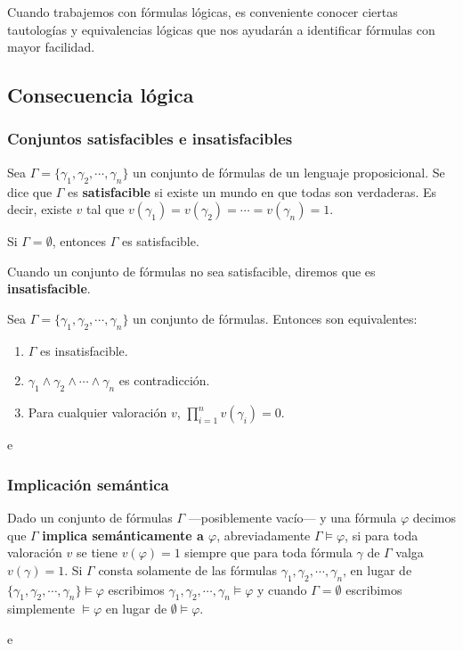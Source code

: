 Cuando trabajemos con fórmulas lógicas, es conveniente conocer ciertas tautologías y equivalencias lógicas que nos ayudarán a identificar fórmulas con mayor facilidad.

\subsection{Consecuencia lógica}
\subsubsection{Conjuntos satisfacibles e insatisfacibles}
\begin{ndef}
    Sea $\Gamma = \{\gamma_1, \gamma_2, \cdots, \gamma_n\}$ un conjunto de fórmulas de un lenguaje proposicional. Se dice que $\Gamma$ es \textbf{satisfacible} si existe un mundo en que todas son verdaderas.
    Es decir, existe $v$ tal que $v(\gamma_1) = v(\gamma_2) = \cdots = v(\gamma_n) = 1$.
\end{ndef}
\begin{nota}
    Si $\Gamma = \emptyset$, entonces $\Gamma$ es satisfacible.
\end{nota}
Cuando un conjunto de fórmulas no sea satisfacible, diremos que es \textbf{insatisfacible}.

\begin{nth}
    Sea $\Gamma = \{\gamma_1, \gamma_2, \cdots, \gamma_n\}$ un conjunto de fórmulas. Entonces son equivalentes:
    \begin{enumerate}
        \item $\Gamma$ es insatisfacible.
        \item $\gamma_1 \land \gamma_2 \land \cdots \land \gamma_n$ es contradicción.
        \item Para cualquier valoración $v$, $\prod^n_{i=1} v(\gamma_i) = 0$.
    \end{enumerate}
\end{nth}
\begin{ejemplo}
    e
\end{ejemplo}

\subsubsection{Implicación semántica}
\begin{ndef}
    Dado un conjunto de fórmulas $\Gamma$ —posiblemente vacío— y una fórmula $\varphi$ decimos que $\Gamma$ \textbf{implica semánticamente a $\varphi$}, abreviadamente $\Gamma \models \varphi$, si para toda valoración $v$ se tiene $v(\varphi) = 1$ siempre que para toda fórmula $\gamma$ de $\Gamma$ valga $v(\gamma) = 1$.
    Si $\Gamma$ consta solamente de las fórmulas $\gamma_1, \gamma_2, \cdots, \gamma_n$, en lugar de$\{\gamma_1, \gamma_2, \cdots, \gamma_n\} \models \varphi$ escribimos $\gamma_1, \gamma_2, \cdots, \gamma_n \models \varphi$ y cuando $\Gamma = \emptyset$ escribimos simplemente $\models \varphi$ en lugar de $\emptyset \models \varphi$.
\end{ndef}
\begin{ejemplo}
    e
\end{ejemplo}

